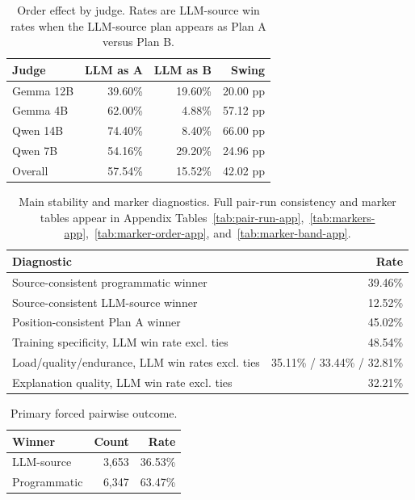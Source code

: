 \documentclass[11pt]{article}
\begin{document}
\begin{table}[H]
\centering
\scriptsize
\setlength{\tabcolsep}{3pt}
\begin{tabular}{lrrr}
\toprule
Judge & LLM as A & LLM as B & Swing \\
\midrule
Gemma 12B & 39.60\% & 19.60\% & 20.00 pp \\
Gemma 4B & 62.00\% & 4.88\% & 57.12 pp \\
Qwen 14B & 74.40\% & 8.40\% & 66.00 pp \\
Qwen 7B & 54.16\% & 29.20\% & 24.96 pp \\
Overall & 57.54\% & 15.52\% & 42.02 pp \\
\bottomrule
\end{tabular}
\caption{Order effect by judge. Rates are LLM-source win rates when the LLM-source plan appears as Plan A versus Plan B.}
\label{tab:order-main}
\end{table}

\begin{table}[H]
\centering
\scriptsize
\setlength{\tabcolsep}{3pt}
\begin{tabular}{p{}r}
\toprule
Diagnostic & Rate \\
\midrule
Source-consistent programmatic winner & 39.46\% \\
Source-consistent LLM-source winner & 12.52\% \\
Position-consistent Plan A winner & 45.02\% \\
Training specificity, LLM win rate excl. ties & 48.54\% \\
Load/quality/endurance, LLM win rates excl. ties & 35.11\% / 33.44\% / 32.81\% \\
Explanation quality, LLM win rate excl. ties & 32.21\% \\
\bottomrule
\end{tabular}
\caption{Main stability and marker diagnostics. Full pair-run consistency and marker tables appear in Appendix Tables~\ref{tab:pair-run-app},~\ref{tab:markers-app},~\ref{tab:marker-order-app}, and~\ref{tab:marker-band-app}.}
\label{tab:diagnostics-main}
\end{table}


\begin{table}[H]
\centering
\small
\begin{tabular}{lrr}
\toprule
Winner & Count & Rate \\
\midrule
LLM-source & 3,653 & 36.53\% \\
Programmatic & 6,347 & 63.47\% \\
\bottomrule
\end{tabular}
\caption{Primary forced pairwise outcome.}
\label{tab:primary-app}
\end{table}
\end{document}
